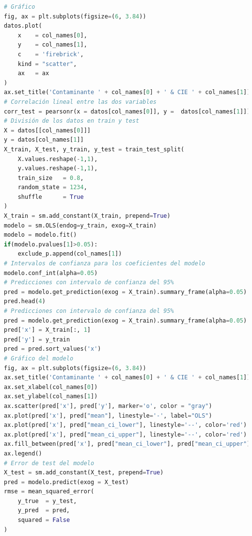 \clearpage
\begin{lstlisting}[language=Python, caption=Generación de los modelos de regresión lineal, label=lst:c4]
# Gráfico
fig, ax = plt.subplots(figsize=(6, 3.84))
datos.plot(
    x    = col_names[0],
    y    = col_names[1],
    c    = 'firebrick',
    kind = "scatter",
    ax   = ax
)
ax.set_title('Contaminante ' + col_names[0] + ' & CIE ' + col_names[1])
# Correlación lineal entre las dos variables
corr_test = pearsonr(x = datos[col_names[0]], y =  datos[col_names[1]])
# División de los datos en train y test
X = datos[[col_names[0]]]
y = datos[col_names[1]]
X_train, X_test, y_train, y_test = train_test_split(
    X.values.reshape(-1,1),
    y.values.reshape(-1,1),
    train_size   = 0.8,
    random_state = 1234,
    shuffle      = True
)
X_train = sm.add_constant(X_train, prepend=True)
modelo = sm.OLS(endog=y_train, exog=X_train)
modelo = modelo.fit()
if(modelo.pvalues[1]>0.05):
    exclude_p.append(col_names[1])
# Intervalos de confianza para los coeficientes del modelo
modelo.conf_int(alpha=0.05)
# Predicciones con intervalo de confianza del 95%
pred = modelo.get_prediction(exog = X_train).summary_frame(alpha=0.05)
pred.head(4)        
# Predicciones con intervalo de confianza del 95%
pred = modelo.get_prediction(exog = X_train).summary_frame(alpha=0.05)
pred['x'] = X_train[:, 1]
pred['y'] = y_train
pred = pred.sort_values('x')
# Gráfico del modelo
fig, ax = plt.subplots(figsize=(6, 3.84))
ax.set_title('Contaminante ' + col_names[0] + ' & CIE ' + col_names[1])
ax.set_xlabel(col_names[0])
ax.set_ylabel(col_names[1])
ax.scatter(pred['x'], pred['y'], marker='o', color = "gray")
ax.plot(pred['x'], pred["mean"], linestyle='-', label="OLS")
ax.plot(pred['x'], pred["mean_ci_lower"], linestyle='--', color='red')
ax.plot(pred['x'], pred["mean_ci_upper"], linestyle='--', color='red')
ax.fill_between(pred['x'], pred["mean_ci_lower"], pred["mean_ci_upper"], 0.1)
ax.legend()
# Error de test del modelo 
X_test = sm.add_constant(X_test, prepend=True)
pred = modelo.predict(exog = X_test)
rmse = mean_squared_error(
    y_true  = y_test,
    y_pred  = pred,
    squared = False
)
\end{lstlisting}

